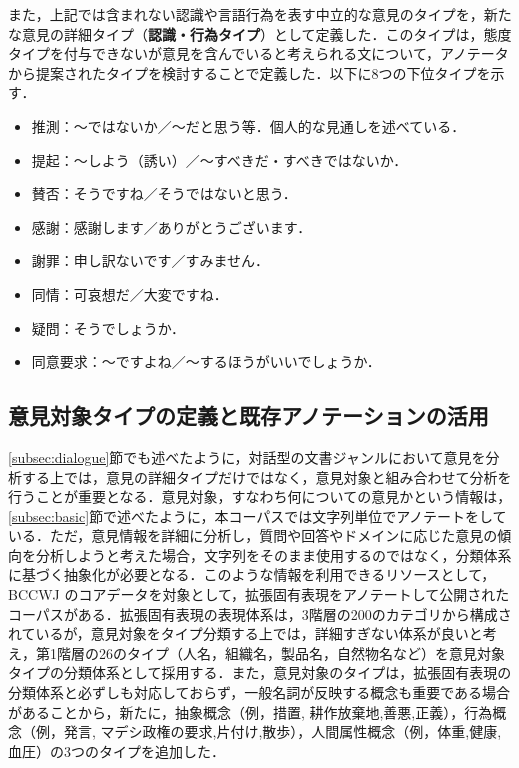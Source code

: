 \documentclass[japanese]{jnlp_1.4}
\begin{document}
また，上記では含まれない認識や言語行為を表す中立的な意見のタイプを，新たな意見の詳細タイプ（{\bf 認識・行為タイプ}）として定義した．このタイプは，態度タイプを付与できないが意見を含んでいると考えられる文について，アノテータから提案されたタイプを検討することで定義した．以下に8つの下位タイプを示す．

\begin{itemize}
\item 推測：〜ではないか／〜だと思う等．個人的な見通しを述べている．
\item 提起：〜しよう（誘い）／〜すべきだ・すべきではないか．
\item 賛否：そうですね／そうではないと思う．
\item 感謝：感謝します／ありがとうございます．
\item 謝罪：申し訳ないです／すみません．
\item 同情：可哀想だ／大変ですね．
\item 疑問：そうでしょうか．
\item 同意要求：〜ですよね／〜するほうがいいでしょうか．
\end{itemize}


\subsection{意見対象タイプの定義と既存アノテーションの活用}
\label{subsec:targettype}

\ref{subsec:dialogue}節でも述べたように，対話型の文書ジャンルにおいて意見を分析する上では，意見の詳細タイプだけではなく，意見対象と組み合わせて分析を行うことが重要となる．意見対象，すなわち何についての意見かという情報は，\ref{subsec:basic}節で述べたように，本コーパスでは文字列単位でアノテートをしている．ただ，意見情報を詳細に分析し，質問や回答やドメインに応じた意見の傾向を分析しようと考えた場合，文字列をそのまま使用するのではなく，分類体系に基づく抽象化が必要となる．このような情報を利用できるリソースとして，BCCWJ のコアデータを対象として，拡張固有表現\cite{sekine2007ene}をアノテートして公開されたコーパス\cite{hasimoto2009nl}がある．拡張固有表現の表現体系は，3階層の200のカテゴリから構成されているが，意見対象をタイプ分類する上では，詳細すぎない体系が良いと考え，第1階層の26のタイプ（人名，組織名，製品名，自然物名など）を意見対象タイプの分類体系として採用する．また，意見対象のタイプは，拡張固有表現の分類体系と必ずしも対応しておらず，一般名詞が反映する概念も重要である場合があることから，新たに，抽象概念（例，措置, 耕作放棄地,善悪,正義），行為概念（例，発言, マデシ政権の要求,片付け,散歩），人間属性概念（例，体重,健康,血圧）の3つのタイプを追加した．
\end{document}
